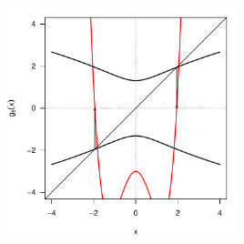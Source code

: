 \documentclass[11pt]{article}
\begin{document}
\begin{center}
\includegraphics[width=0.5\textwidth]{good.pdf}
\end{center}%
\end{document}
